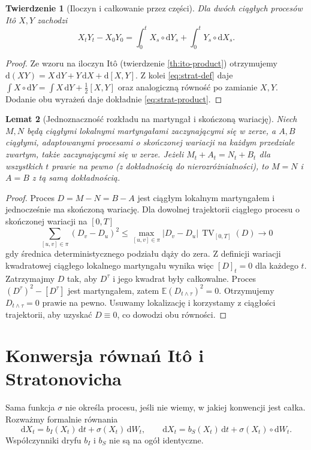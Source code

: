 \documentclass[11pt,a4paper,oneside]{report}
\numberwithin{equation}{chapter}
\theoremstyle{plain}
\newtheorem{twierdzenie}{Twierdzenie}[chapter]
\newtheorem{lemat}[twierdzenie]{Lemat}
\theoremstyle{definition}
\theoremstyle{remark}
\newcommand{\E}{\mathbb{E}}
\newcommand{\dd}{\mathrm{d}}
\begin{document}
\begin{twierdzenie}[Iloczyn i całkowanie przez części]
Dla dwóch ciągłych procesów Itô $X,Y$ zachodzi
\[
X_tY_t-X_0Y_0
=\int_0^tX_s\circ\dd Y_s+
\int_0^tY_s\circ\dd X_s.
\tag{4.7}\label{eq:strat-product}
\]
\end{twierdzenie}
\begin{proof}
Ze wzoru na iloczyn Itô (twierdzenie
\ref{th:ito-product}) otrzymujemy
$\dd(XY)=X\,\dd Y+Y\,\dd X+\dd[X,Y]$.
Z kolei \eqref{eq:strat-def} daje
$\int X\circ\dd Y=\int X\,\dd Y+\frac12[X,Y]$
oraz analogiczną równość po zamianie $X,Y$.
Dodanie obu wyrażeń daje dokładnie
\eqref{eq:strat-product}.
\end{proof}

\begin{lemat}[Jednoznaczność rozkładu na martyngał i skończoną wariację]
\label{lem:uniqueness-mart-fv}
Niech $M,N$ będą ciągłymi lokalnymi martyngałami zaczynającymi się
w zerze, a $A,B$ ciągłymi, adaptowanymi procesami o skończonej
wariacji na każdym przedziale zwartym, także zaczynającymi się
w zerze. Jeżeli $M_t+A_t=N_t+B_t$ dla wszystkich $t$ prawie
na pewno (z dokładnością do nierozróżnialności), to $M=N$ i
$A=B$ z tą samą dokładnością.
\end{lemat}
\begin{proof}
Proces $D=M-N=B-A$ jest ciągłym lokalnym martyngałem
i jednocześnie ma skończoną wariację. Dla dowolnej
trajektorii ciągłego procesu o skończonej wariacji na $[0,T]$
\[
\sum_{[u,v]\in\pi}(D_v-D_u)^2
\le\max_{[u,v]\in\pi}|D_v-D_u|\,\operatorname{TV}_{[0,T]}(D)
\longrightarrow0
\]
gdy średnica deterministycznego podziału dąży do zera.
Z definicji wariacji kwadratowej ciągłego lokalnego
martyngału wynika więc $[D]_t=0$ dla każdego $t$.
Zatrzymajmy $D$ tak, aby $D^\tau$ i jego kwadrat były
całkowalne. Proces $(D^\tau)^2-[D^\tau]$
jest martyngałem, zatem
$\E(D_{t\wedge\tau})^2=0$.
Otrzymujemy $D_{t\wedge\tau}=0$ prawie na pewno.
Usuwamy lokalizację i korzystamy z ciągłości trajektorii,
aby uzyskać $D\equiv0$, co dowodzi obu równości.
\end{proof}

\section{Konwersja równań Itô i Stratonovicha}
Sama funkcja $\sigma$ nie określa procesu, jeśli nie
wiemy, w jakiej konwencji jest całka. Rozważmy
formalnie równania
\[
\dd X_t=b_I(X_t)\,\dd t+\sigma(X_t)\,\dd W_t,
\qquad
\dd X_t=b_S(X_t)\,\dd t+\sigma(X_t)\circ\dd W_t.
\]
Współczynniki dryfu $b_I$ i $b_S$ nie są na ogół
identyczne.
\end{document}
